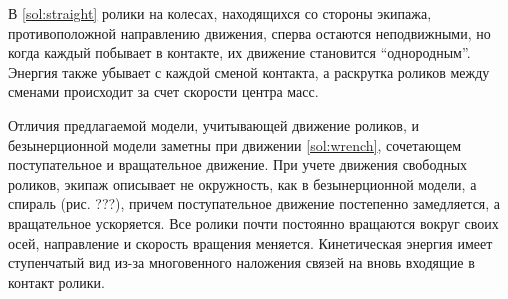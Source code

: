 В \ref{sol:straight} ролики на колесах, находящихся со стороны экипажа, противоположной направлению движения, сперва остаются неподвижными, но когда каждый побывает в контакте, их движение становится ``однородным''. Энергия также убывает с каждой сменой контакта, а раскрутка роликов между сменами происходит за счет скорости центра масс.

Отличия предлагаемой модели, учитывающей движение роликов, и безынерционной модели заметны при движении \ref{sol:wrench}, сочетающем поступательное и вращательное движение. При учете движения свободных роликов, экипаж описывает не окружность, как в безынерционной модели, а спираль (рис. ???), причем поступательное движение постепенно замедляется, а вращательное ускоряется. Все ролики почти постоянно вращаются вокруг своих осей, направление и скорость вращения меняется. Кинетическая энергия имеет ступенчатый вид из-за многовенного наложения связей на вновь входящие в контакт ролики.


